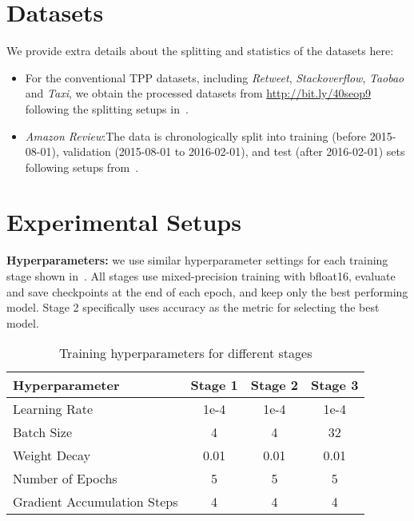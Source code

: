\section{Datasets}\label{ap:datasets}
We provide extra details about the splitting and statistics of the datasets here:
\begin{itemize}
    \item For the conventional TPP datasets, including \textit{Retweet}, \textit{Stackoverflow}, \textit{Taobao} and \textit{Taxi}, we obtain the processed datasets from \url{http://bit.ly/40seop9} following the splitting setups in~\citep{xue2023easytpp}.
    \item \textit{Amazon Review}:The data is chronologically split into training (before 2015-08-01), validation (2015-08-01 to 2016-02-01), and test (after 2016-02-01) sets following setups from~\citet{shi2024language}.
\end{itemize}


\section{Experimental Setups}\label{sssec:hyper}

\textbf{Hyperparameters:} we use similar hyperparameter settings for each training stage shown in~. All stages use mixed-precision training with bfloat16, evaluate and save checkpoints at the end of each epoch, and keep only the best performing model. Stage 2 specifically uses accuracy as the metric for selecting the best model.
\begin{table}[htp]
\centering
\begin{tabular}{lccc}
\toprule
\textbf{Hyperparameter} & \textbf{Stage 1} & \textbf{Stage 2} & \textbf{Stage 3} \\
\midrule
Learning Rate & 1e-4 & 1e-4 & 1e-4 \\
Batch Size & 4 & 4 & 32 \\
Weight Decay & 0.01 & 0.01 & 0.01 \\
Number of Epochs & 5 & 5 & 5 \\
Gradient Accumulation Steps & 4 & 4 & 4 \\
\bottomrule
\end{tabular}
\caption{Training hyperparameters for different stages}
\label{tab:hyperparams}
\end{table}


